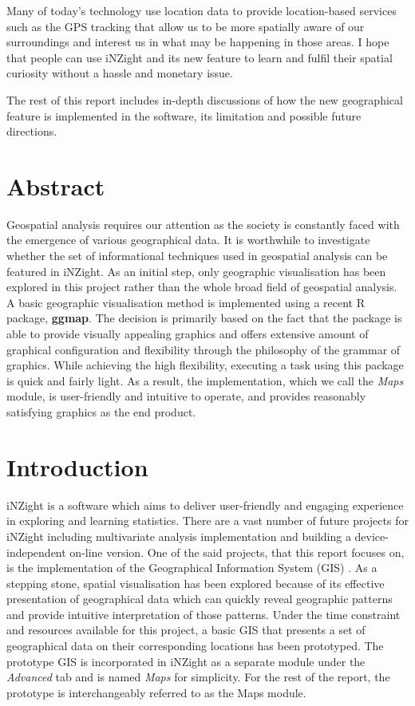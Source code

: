 \documentclass[a4paper, 12pt]{article}
\begin{document}
Many of today's technology use location data to provide location-based services such as the GPS tracking that allow us to be more spatially aware of our surroundings and interest us in what may be happening in those areas. I hope that people can use iNZight and its new feature to learn and fulfil their spatial curiosity without a hassle and monetary issue.

The rest of this report includes in-depth discussions of how the new geographical feature is implemented in the software, its limitation and possible future directions.

\newpage
\section*{Abstract}
Geospatial analysis requires our attention as the society is constantly faced with the emergence of various geographical data. It is worthwhile to investigate whether the set of informational techniques used in geospatial analysis can be featured in iNZight. As an initial step, only geographic visualisation has been explored in this project rather than the whole broad field of geospatial analysis. A basic geographic visualisation method is implemented using a recent R package, \textbf{ggmap}. The decision is primarily based on the fact that the package is able to provide visually appealing graphics and offers extensive amount of graphical configuration and flexibility through the philosophy of the grammar of graphics. While achieving the high flexibility, executing a task using this package is quick and fairly light. As a result, the implementation, which we call the \emph{Maps} module, is user-friendly and intuitive to operate, and provides reasonably satisfying graphics as the end product.

\newpage
\section{Introduction}
\label{sec:1}
iNZight is a software which aims to deliver user-friendly and engaging experience in exploring and learning statistics. There are a vast number of future projects for iNZight including multivariate analysis implementation and building a device-independent on-line version. One of the said projects, that this report focuses on, is the implementation of the Geographical Information System (GIS) \cite{tom68}. As a stepping stone, spatial visualisation has been explored because of its effective presentation of geographical data which can quickly reveal geographic patterns and provide intuitive interpretation of those patterns. Under the time constraint and resources available for this project, a basic GIS that presents a set of geographical data on their corresponding locations has been prototyped. The prototype GIS is incorporated in iNZight as a separate module under the \emph{Advanced} tab and is named \emph{Maps} for simplicity. For the rest of the report, the prototype is interchangeably referred to as the Maps module.
\end{document}
